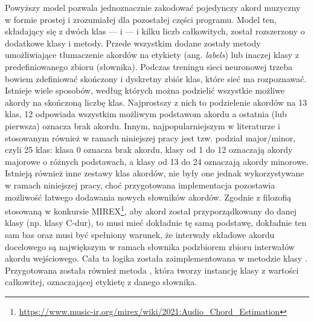 Powyższy model pozwala jednoznacznie zakodować pojedynczy akord muzyczny w formie prostej i zrozumiałej dla pozostałej części programu. Model ten, składający się z dwóch klas ---  i  --- i kilku liczb całkowitych, został rozszerzony o dodatkowe klasy i metody. Przede wszystkim dodane zostały metody umożliwiające tłumaczenie akordów na etykiety (ang. \emph{labels}) lub inaczej klasy z predefiniowanego zbioru (słownika). Podczas treningu sieci neuronowej trzeba bowiem zdefiniować skończony i dyskretny zbiór klas, które sieć ma rozpoznawać. Istnieje wiele sposobów, według których można podzielić wszystkie możliwe akordy na skończoną liczbę klas.  Najprostszy z nich to podzielenie akordów na 13 klas, 12 odpowiada wszystkim możliwym podstawom akordu a ostatnia (lub pierwsza) oznacza brak akordu. Innym, najpopularniejszym w literaturze i stosowanym również w ramach niniejszej pracy jest tzw. podział major/minor, czyli 25 klas: klasa 0 oznacza brak akordu, klasy od 1 do 12 oznaczają akordy majorowe o różnych podstawach, a klasy od 13 do 24 oznaczają akordy minorowe. Istnieją również inne zestawy klas akordów, nie były one jednak wykorzystywane w ramach niniejszej pracy, choć przygotowana implementacja pozostawia możliwość łatwego dodawania nowych słowników akordów. Zgodnie z filozofią stosowaną w konkursie MIREX\footnote{\url{https://www.music-ir.org/mirex/wiki/2021:Audio_Chord_Estimation}}, aby akord został przyporządkowany do danej klasy (np. klasy C-dur), to musi mieć dokładnie tę samą podstawę, dokładnie ten sam bas oraz musi być spełniony warunek, że interwały składowe akordu docelowego są największym w ramach słownika podzbiorem zbioru interwałów akordu wejściowego. Cała ta logika została zaimplementowana w metodzie  klasy . Przygotowana została również metoda , która tworzy instancję klasy  z wartości całkowitej, oznaczającej etykietę z danego słownika.

